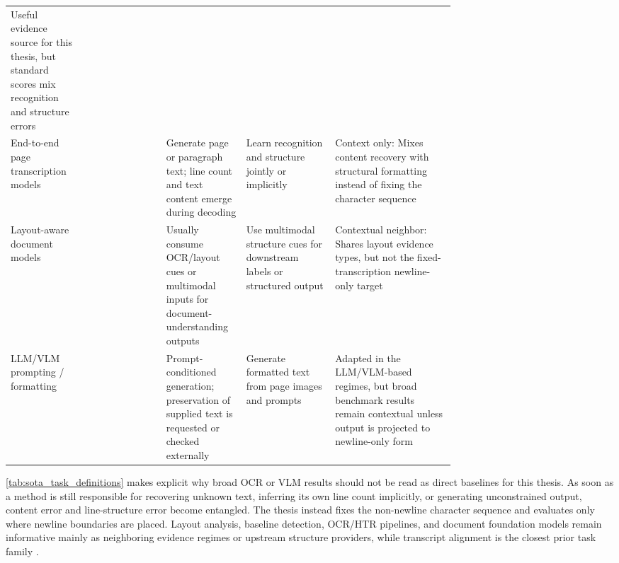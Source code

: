 \begin{table}[t]
\begin{tabularx}{\linewidth}{@{}>{\raggedright\arraybackslash}p{0.17\linewidth}>{\raggedright\arraybackslash}p{0.18\linewidth}>{\raggedright\arraybackslash}p{0.18\linewidth}>{\raggedright\arraybackslash}p{0.20\linewidth}Y@{}}
        Useful evidence source for this thesis, but standard scores mix recognition and structure errors \\
        \addlinespace[0.2em]
        End-to-end page transcription models &
         &
        Generate page or paragraph text; line count and text content emerge during decoding &
        Learn recognition and structure jointly or implicitly &
        Context only: Mixes content recovery with structural formatting instead of fixing the character sequence \\
        \addlinespace[0.2em]
        Layout-aware document models &
         &
        Usually consume OCR/layout cues or multimodal inputs for document-understanding outputs &
        Use multimodal structure cues for downstream labels or structured output &
        Contextual neighbor: Shares layout evidence types, but not the fixed-transcription newline-only target \\
        \addlinespace[0.2em]
        LLM/VLM prompting / formatting &
         &
        Prompt-conditioned generation; preservation of supplied text is requested or checked externally &
        Generate formatted text from page images and prompts &
        Adapted in the LLM/VLM-based regimes, but broad benchmark results remain contextual unless output is projected to newline-only form \\
        \bottomrule
    \end{tabularx}
\end{table}

\noindent \autoref{tab:sota_task_definitions} makes explicit why broad OCR or VLM results should not be read as direct baselines for this thesis. As soon as a method is still responsible for recovering unknown text, inferring its own line count implicitly, or generating unconstrained output, content error and line-structure error become entangled. The thesis instead fixes the non-newline character sequence and evaluates only where newline boundaries are placed. Layout analysis, baseline detection, OCR/HTR pipelines, and document foundation models remain informative mainly as neighboring evidence regimes or upstream structure providers, while transcript alignment is the closest prior task family .


